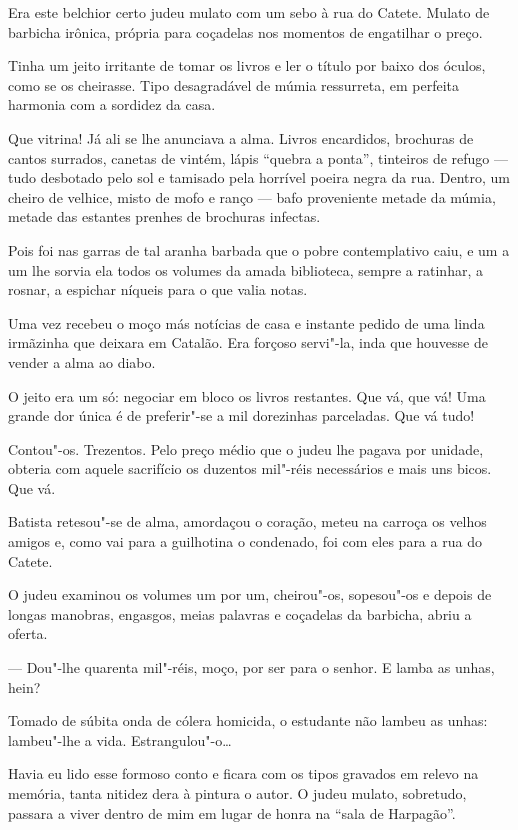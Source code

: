 Era este belchior certo judeu mulato com um sebo à rua do Catete. Mulato
de barbicha irônica, própria para coçadelas nos momentos de engatilhar o
preço.

Tinha um jeito irritante de tomar os livros e ler o título por baixo dos
óculos, como se os cheirasse. Tipo desagradável de múmia ressurreta, em
perfeita harmonia com a sordidez da casa.

Que vitrina! Já ali se lhe anunciava a alma. Livros encardidos,
brochuras de cantos surrados, canetas de vintém, lápis ``quebra a
ponta'', tinteiros de refugo --- tudo desbotado pelo sol e tamisado pela
horrível poeira negra da rua. Dentro, um cheiro de velhice, misto de
mofo e ranço --- bafo proveniente metade da múmia, metade das estantes
prenhes de brochuras infectas.

Pois foi nas garras de tal aranha barbada que o pobre contemplativo
caiu, e um a um lhe sorvia ela todos os volumes da amada biblioteca,
sempre a ratinhar, a rosnar, a espichar níqueis para o que valia notas.

Uma vez recebeu o moço más notícias de casa e instante pedido de uma
linda irmãzinha que deixara em Catalão. Era forçoso servi"-la, inda que
houvesse de vender a alma ao diabo.

O jeito era um só: negociar em bloco os livros restantes. Que vá, que
vá! Uma grande dor única é de preferir"-se a mil dorezinhas parceladas.
Que vá tudo!

Contou"-os. Trezentos. Pelo preço médio que o judeu lhe pagava por
unidade, obteria com aquele sacrifício os duzentos mil"-réis necessários
e mais uns bicos. Que vá.

Batista retesou"-se de alma, amordaçou o coração, meteu na carroça os
velhos amigos e, como vai para a guilhotina o condenado, foi com eles
para a rua do Catete.

O judeu examinou os volumes um por um, cheirou"-os, sopesou"-os e depois
de longas manobras, engasgos, meias palavras e coçadelas da barbicha,
abriu a oferta.

--- Dou"-lhe quarenta mil"-réis, moço, por ser para o senhor. E lamba as
unhas, hein?

Tomado de súbita onda de cólera homicida, o estudante não lambeu as
unhas: lambeu"-lhe a vida. Estrangulou"-o\ldots{}

Havia eu lido esse formoso conto e ficara com os tipos gravados em
relevo na memória, tanta nitidez dera à pintura o autor. O judeu mulato,
sobretudo, passara a viver dentro de mim em lugar de honra na ``sala de
Harpagão''.

